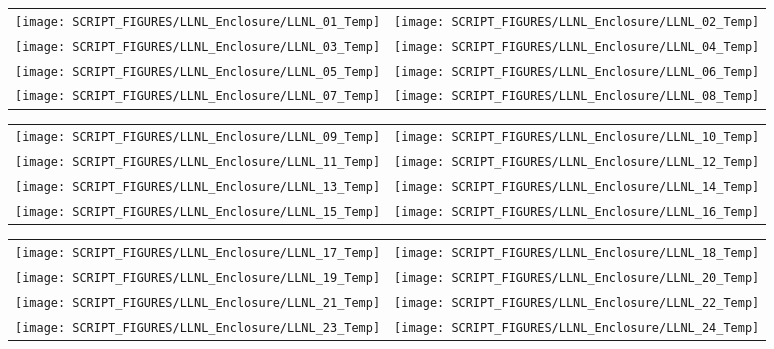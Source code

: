 \begin{figure}[p]
\begin{tabular*}{\textwidth}{l@{\extracolsep{\fill}}r}
\texttt{[image: SCRIPT\_FIGURES/LLNL\_Enclosure/LLNL\_01\_Temp]} &
\texttt{[image: SCRIPT\_FIGURES/LLNL\_Enclosure/LLNL\_02\_Temp]} \\
\texttt{[image: SCRIPT\_FIGURES/LLNL\_Enclosure/LLNL\_03\_Temp]} &
\texttt{[image: SCRIPT\_FIGURES/LLNL\_Enclosure/LLNL\_04\_Temp]} \\
\texttt{[image: SCRIPT\_FIGURES/LLNL\_Enclosure/LLNL\_05\_Temp]} &
\texttt{[image: SCRIPT\_FIGURES/LLNL\_Enclosure/LLNL\_06\_Temp]} \\
\texttt{[image: SCRIPT\_FIGURES/LLNL\_Enclosure/LLNL\_07\_Temp]} &
\texttt{[image: SCRIPT\_FIGURES/LLNL\_Enclosure/LLNL\_08\_Temp]}
\end{tabular*}
\label{LLNL_Enclosure_Temp_1}
\end{figure}

\begin{figure}[p]
\begin{tabular*}{\textwidth}{l@{\extracolsep{\fill}}r}
\texttt{[image: SCRIPT\_FIGURES/LLNL\_Enclosure/LLNL\_09\_Temp]} &
\texttt{[image: SCRIPT\_FIGURES/LLNL\_Enclosure/LLNL\_10\_Temp]} \\
\texttt{[image: SCRIPT\_FIGURES/LLNL\_Enclosure/LLNL\_11\_Temp]} &
\texttt{[image: SCRIPT\_FIGURES/LLNL\_Enclosure/LLNL\_12\_Temp]} \\
\texttt{[image: SCRIPT\_FIGURES/LLNL\_Enclosure/LLNL\_13\_Temp]} &
\texttt{[image: SCRIPT\_FIGURES/LLNL\_Enclosure/LLNL\_14\_Temp]} \\
\texttt{[image: SCRIPT\_FIGURES/LLNL\_Enclosure/LLNL\_15\_Temp]} &
\texttt{[image: SCRIPT\_FIGURES/LLNL\_Enclosure/LLNL\_16\_Temp]}
\end{tabular*}
\label{LLNL_Enclosure_Temp_2}
\end{figure}

\begin{figure}[p]
\begin{tabular*}{\textwidth}{l@{\extracolsep{\fill}}r}
\texttt{[image: SCRIPT\_FIGURES/LLNL\_Enclosure/LLNL\_17\_Temp]} &
\texttt{[image: SCRIPT\_FIGURES/LLNL\_Enclosure/LLNL\_18\_Temp]} \\
\texttt{[image: SCRIPT\_FIGURES/LLNL\_Enclosure/LLNL\_19\_Temp]} &
\texttt{[image: SCRIPT\_FIGURES/LLNL\_Enclosure/LLNL\_20\_Temp]} \\
\texttt{[image: SCRIPT\_FIGURES/LLNL\_Enclosure/LLNL\_21\_Temp]} &
\texttt{[image: SCRIPT\_FIGURES/LLNL\_Enclosure/LLNL\_22\_Temp]} \\
\texttt{[image: SCRIPT\_FIGURES/LLNL\_Enclosure/LLNL\_23\_Temp]} &
\texttt{[image: SCRIPT\_FIGURES/LLNL\_Enclosure/LLNL\_24\_Temp]}
\end{tabular*}
\label{LLNL_Enclosure_Temp_3}
\end{figure}

